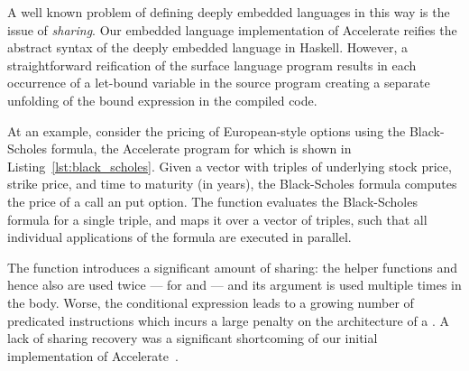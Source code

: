 A well known problem of defining deeply embedded languages in this way is the issue of
\emph{sharing}. Our embedded language implementation of Accelerate reifies the abstract syntax of
the deeply embedded language in Haskell. However, a straightforward reification of the surface
language program results in each occurrence of a let-bound variable in the source program creating a
separate unfolding of the bound expression in the compiled code.

At an example, consider the pricing of European-style options using the Black-Scholes formula, the
Accelerate program for which is shown in Listing~\ref{lst:black_scholes}. Given a vector with
triples of underlying stock price, strike price, and time to maturity (in years), the Black-Scholes
formula computes the price of a call an put option. The function  evaluates the
Black-Scholes formula for a single triple, and  maps it over a vector of triples,
such that all individual applications of the formula are executed in parallel.

The function  introduces a significant amount of sharing: the helper functions
 and hence also  are used twice --- for  and  --- and its
argument  is used multiple times in the body. Worse, the conditional expression leads to a
growing number of predicated instructions which incurs a large penalty on the \SIMD architecture of
a \GPU\@. A lack of sharing recovery was a significant shortcoming of our initial implementation of
Accelerate~\cite{Chakravarty:2011fr}.

%


